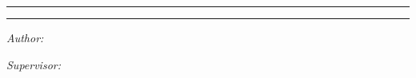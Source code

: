 \begin{titlepage}
  \centering
  \vspace*{1.5cm}

  {\scshape\Large \theinstitution \par}
  \vspace{0.5cm}
  \rule{\linewidth}{0.4pt}
  \vspace{0.5cm}

  {\Huge\bfseries \thesistitle \par}
  \vspace{0.4cm}
  {\large \thesissubtitle \par}

  \vspace{0.5cm}
  \rule{\linewidth}{0.4pt}
  \vspace{2cm}

  {\large\itshape Author:\par}
  {\large \theauthor \par}

  \vspace{1.5cm}

  {\large\itshape Supervisor:\par}
  {\large \thesupervisor \par}

  \vfill

  {\large \theyear \par}
\end{titlepage}
\cleardoublepage
